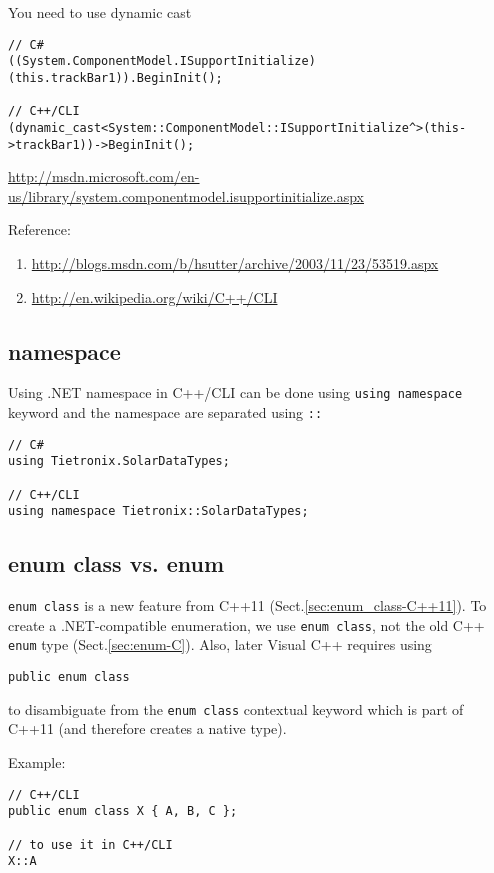 You need to use dynamic cast
\begin{verbatim}
// C#
((System.ComponentModel.ISupportInitialize)(this.trackBar1)).BeginInit();

// C++/CLI
(dynamic_cast<System::ComponentModel::ISupportInitialize^>(this->trackBar1))->BeginInit();
\end{verbatim}
\url{http://msdn.microsoft.com/en-us/library/system.componentmodel.isupportinitialize.aspx}


Reference: 
\begin{enumerate}
  \item \url{http://blogs.msdn.com/b/hsutter/archive/2003/11/23/53519.aspx}

  \item \url{http://en.wikipedia.org/wiki/C++/CLI}
\end{enumerate}

\subsection{namespace}
\label{sec:C++/CLI_namespace}

Using .NET namespace in C++/CLI can be done using \verb!using namespace! keyword
and the namespace are separated using \verb!::!

\begin{verbatim}
// C#
using Tietronix.SolarDataTypes;

// C++/CLI
using namespace Tietronix::SolarDataTypes;
\end{verbatim}


\subsection{enum class vs. enum}
\label{sec:enum-class-C++/CLI}

\verb!enum class! is a new feature from C++11 (Sect.\ref{sec:enum_class-C++11}).
To create a .NET-compatible enumeration, we use \verb!enum class!, not the
old C++ \verb!enum! type (Sect.\ref{sec:enum-C}). Also, later Visual C++ requires
using
\begin{verbatim}
public enum class
\end{verbatim}
to disambiguate from the \verb!enum class! contextual keyword which is part of
C++11 (and therefore creates a native type).

Example:
\begin{verbatim}
// C++/CLI
public enum class X { A, B, C };

// to use it in C++/CLI
X::A
\end{verbatim}

